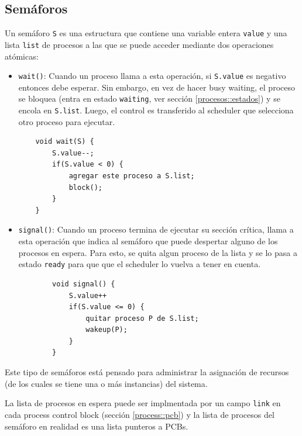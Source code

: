 \subsection{Semáforos}
Un semáforo \texttt{S} es una estructura que contiene una variable entera \texttt{value} y una lista \texttt{list} de procesos a las que se puede acceder mediante dos operaciones atómicas:
\begin{itemize}
	\item \texttt{wait()}: Cuando un proceso llama a esta operación, si \texttt{S.value} es negativo entonces debe esperar. Sin embargo, en vez de hacer busy waiting, el proceso se bloquea (entra en estado \texttt{waiting}, ver sección \ref{procesos::estados}) y se encola en \texttt{S.list}. Luego, el control es transferido al scheduler que selecciona otro proceso para ejecutar.
\begin{verbatim}
	void wait(S) {
		S.value--;
		if(S.value < 0) {
			agregar este proceso a S.list;
			block();
		}
	}
\end{verbatim}
	\item \texttt{signal()}: Cuando un proceso termina de ejecutar su sección crítica, llama a esta operación que indica al semáforo que puede despertar alguno de los procesos en espera. Para esto, se quita algun proceso de la lista y se lo pasa a estado \texttt{ready} para que que el scheduler lo vuelva a tener en cuenta.
	\begin{verbatim}
		void signal() {
			S.value++
			if(S.value <= 0) {
				quitar proceso P de S.list;
				wakeup(P);
			}	
		}
	\end{verbatim}
\end{itemize}

Este tipo de semáforos está pensado para administrar la asignación de recursos (de los cuales se tiene una o más instancias) del sistema.

La lista de procesos en espera puede ser implmentada por un campo \texttt{link} en cada process control block (sección \ref{process::pcb}) y la lista de procesos del semáforo en realidad es una lista punteros a PCBs.

